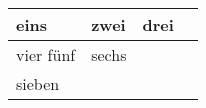 \documentclass{article}
\begin{document}
\begin{center} 
\begin{tabular}{llll}
  eins & zwei & drei \\ \hline
  vier \vline{} f\"unf & sechs & \\
  \cline{1-2}
  \multicolumn{3}{|l|}{sieben}
\end{tabular}
\end{center}
\end{document}
